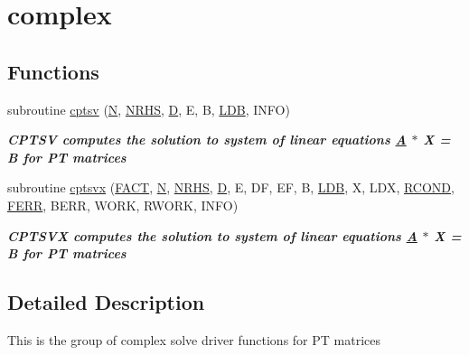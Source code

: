 \hypertarget{group__complexPTsolve}{}\section{complex}
\label{group__complexPTsolve}
\subsection*{Functions}
\begin{DoxyCompactItemize}
\item 
subroutine \hyperlink{group__complexPTsolve_gab2cf9c94b022c5350b6c5b6bcd2744e8}{cptsv} (\hyperlink{polmisc_8c_a0240ac851181b84ac374872dc5434ee4}{N}, \hyperlink{example__user_8c_aa0138da002ce2a90360df2f521eb3198}{N\+R\+H\+S}, \hyperlink{odrpack_8h_a7dae6ea403d00f3687f24a874e67d139}{D}, E, B, \hyperlink{example__user_8c_a50e90a7104df172b5a89a06c47fcca04}{L\+D\+B}, I\+N\+F\+O)
\begin{DoxyCompactList}\small\item\em {\bfseries  C\+P\+T\+S\+V computes the solution to system of linear equations \hyperlink{classA}{A} $\ast$ X = B for P\+T matrices} \end{DoxyCompactList}\item 
subroutine \hyperlink{group__complexPTsolve_ga32f573f1f8ee1da3094e15474bbcc0fe}{cptsvx} (\hyperlink{superlu__enum__consts_8h_af00a42ecad444bbda75cde1b64bd7e72a1b6692b56d378abb85bd49063721d034}{F\+A\+C\+T}, \hyperlink{polmisc_8c_a0240ac851181b84ac374872dc5434ee4}{N}, \hyperlink{example__user_8c_aa0138da002ce2a90360df2f521eb3198}{N\+R\+H\+S}, \hyperlink{odrpack_8h_a7dae6ea403d00f3687f24a874e67d139}{D}, E, D\+F, E\+F, B, \hyperlink{example__user_8c_a50e90a7104df172b5a89a06c47fcca04}{L\+D\+B}, X, L\+D\+X, \hyperlink{superlu__enum__consts_8h_af00a42ecad444bbda75cde1b64bd7e72a9b5c151728d8512307565994c89919d5}{R\+C\+O\+N\+D}, \hyperlink{superlu__enum__consts_8h_af00a42ecad444bbda75cde1b64bd7e72a78fd14d7abebae04095cfbe02928f153}{F\+E\+R\+R}, B\+E\+R\+R, W\+O\+R\+K, R\+W\+O\+R\+K, I\+N\+F\+O)
\begin{DoxyCompactList}\small\item\em {\bfseries  C\+P\+T\+S\+V\+X computes the solution to system of linear equations \hyperlink{classA}{A} $\ast$ X = B for P\+T matrices} \end{DoxyCompactList}\end{DoxyCompactItemize}


\subsection{Detailed Description}
This is the group of complex solve driver functions for P\+T matrices 

